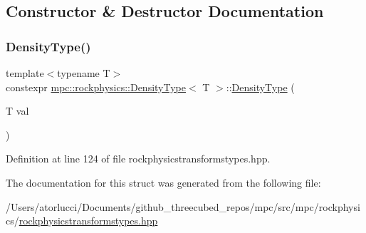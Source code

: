 \subsection{Constructor \& Destructor Documentation}
\mbox{\label{structmpc_1_1rockphysics_1_1_density_type_a2d38b577150e0f26513dbf9927d6034d}} 
\subsubsection{\texorpdfstring{Density\+Type()}{DensityType()}}
{\footnotesize\ttfamily template$<$typename T$>$ \\
constexpr \mbox{\hyperlink{structmpc_1_1rockphysics_1_1_density_type}{mpc\+::rockphysics\+::\+Density\+Type}}$<$ T $>$\+::\mbox{\hyperlink{structmpc_1_1rockphysics_1_1_density_type}{Density\+Type}} (\begin{DoxyParamCaption}\item[{T}]{val }\end{DoxyParamCaption})\hspace{0.3cm}{\ttfamily [inline]}}



Definition at line 124 of file rockphysicstransformstypes.\+hpp.



The documentation for this struct was generated from the following file\+:\begin{DoxyCompactItemize}
\item 
/\+Users/atorlucci/\+Documents/github\+\_\+threecubed\+\_\+repos/mpc/src/mpc/rockphysics/\mbox{\hyperlink{rockphysicstransformstypes_8hpp}{rockphysicstransformstypes.\+hpp}}\end{DoxyCompactItemize}
